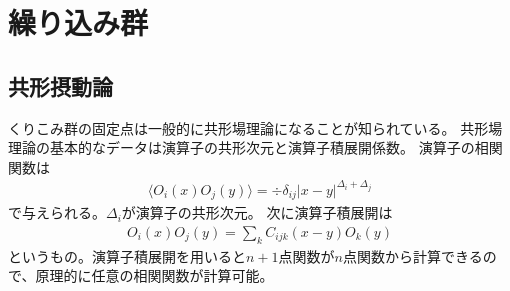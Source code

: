 \documentclass[12pt]{ltjsarticle}
\begin{document}
\section{繰り込み群}
\subsection*{共形摂動論}

くりこみ群の固定点は一般的に共形場理論になることが知られている。
共形場理論の基本的なデータは演算子の共形次元と演算子積展開係数。
演算子の相関関数は
\begin{align}
    ⟨O_i(x)O_j(y)⟩ = ÷{δ_{ij}}{|x-y|^{Δ_i+Δ_j}}
\end{align}
で与えられる。$Δ_i$が演算子の共形次元。
次に演算子積展開は
\begin{align}
    O_i(x)O_j(y) = ∑_{k} C_{ijk}(x-y)O_k(y)
\end{align}
というもの。演算子積展開を用いると$n+1$点関数が$n$点関数から計算できるので、原理的に任意の相関関数が計算可能。
\end{document}
